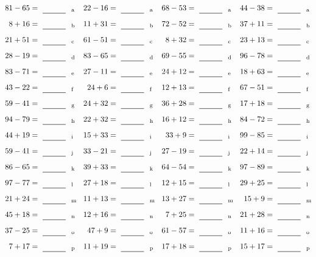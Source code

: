 \documentclass
[
  draft    = true,
  fontsize = 11pt,
  parskip  = half-
]
{scrartcl}
\begin{document}
\clearpage
\begin{align*}
    \pline{81-65}&=\rline{a}
  & \pline{22-16}&=\rline{a}
  & \pline{68-53}&=\rline{a}
  & \pline{44-38}&=\rline{a} \\[1ex]
    \pline{8+16}&=\rline{b}
  & \pline{11+31}&=\rline{b}
  & \pline{72-52}&=\rline{b}
  & \pline{37+11}&=\rline{b} \\[1ex]
    \pline{21+51}&=\rline{c}
  & \pline{61-51}&=\rline{c}
  & \pline{8+32}&=\rline{c}
  & \pline{23+13}&=\rline{c} \\[1ex]
    \pline{28-19}&=\rline{d}
  & \pline{83-65}&=\rline{d}
  & \pline{69-55}&=\rline{d}
  & \pline{96-78}&=\rline{d} \\[1ex]
    \pline{83-71}&=\rline{e}
  & \pline{27-11}&=\rline{e}
  & \pline{24+12}&=\rline{e}
  & \pline{18+63}&=\rline{e} \\[1ex]
    \pline{43-22}&=\rline{f}
  & \pline{24+6}&=\rline{f}
  & \pline{12+13}&=\rline{f}
  & \pline{67-51}&=\rline{f} \\[1ex]
    \pline{59-41}&=\rline{g}
  & \pline{24+32}&=\rline{g}
  & \pline{36+28}&=\rline{g}
  & \pline{17+18}&=\rline{g} \\[1ex]
    \pline{94-79}&=\rline{h}
  & \pline{22+32}&=\rline{h}
  & \pline{16+12}&=\rline{h}
  & \pline{84-72}&=\rline{h} \\[1ex]
    \pline{44+19}&=\rline{i}
  & \pline{15+33}&=\rline{i}
  & \pline{33+9}&=\rline{i}
  & \pline{99-85}&=\rline{i} \\[1ex]
    \pline{59-41}&=\rline{j}
  & \pline{33-21}&=\rline{j}
  & \pline{27-19}&=\rline{j}
  & \pline{22+14}&=\rline{j} \\[1ex]
    \pline{86-65}&=\rline{k}
  & \pline{39+33}&=\rline{k}
  & \pline{64-54}&=\rline{k}
  & \pline{97-89}&=\rline{k} \\[1ex]
    \pline{97-77}&=\rline{l}
  & \pline{27+18}&=\rline{l}
  & \pline{12+15}&=\rline{l}
  & \pline{29+25}&=\rline{l} \\[1ex]
    \pline{21+24}&=\rline{m}
  & \pline{11+13}&=\rline{m}
  & \pline{13+27}&=\rline{m}
  & \pline{15+9}&=\rline{m} \\[1ex]
    \pline{45+18}&=\rline{n}
  & \pline{12+16}&=\rline{n}
  & \pline{7+25}&=\rline{n}
  & \pline{21+28}&=\rline{n} \\[1ex]
    \pline{37-25}&=\rline{o}
  & \pline{47+9}&=\rline{o}
  & \pline{61-57}&=\rline{o}
  & \pline{11+16}&=\rline{o} \\[1ex]
    \pline{7+17}&=\rline{p}
  & \pline{11+19}&=\rline{p}
  & \pline{17+18}&=\rline{p}
  & \pline{15+17}&=\rline{p}
\end{align*}
\end{document}

